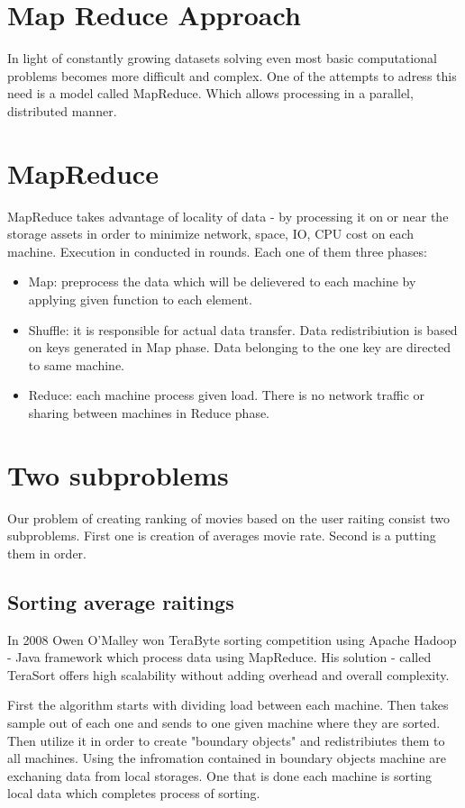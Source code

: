 \section{Map Reduce Approach}
In light of constantly growing datasets solving even 
most basic computational problems becomes more difficult and complex.
One of the attempts to adress this need is a model called MapReduce.
Which allows processing in a parallel, distributed manner.

\section{MapReduce}
MapReduce takes advantage of locality of data - by processing it on 
or near the storage assets in order to minimize network, space, IO, CPU cost on each machine.
Execution in conducted in rounds.  Each one of them three phases:

\begin{itemize}
\item Map: preprocess the data which will be delievered to each machine by applying 
given function to each element. 
\item Shuffle: it is responsible for actual data transfer. Data redistribiution is based on 
keys generated in Map phase. Data belonging to the one key are directed to same machine. 
\item Reduce: each machine process given load. There is no network traffic or sharing between machines
in Reduce phase.
\end{itemize}

\section{Two subproblems}
Our problem of creating ranking of movies based on the user raiting 
consist two subproblems. First one is creation of averages movie rate.
Second is a putting them in order. 

\subsection{Sorting average raitings}
In 2008 Owen O'Malley won TeraByte sorting competition using Apache Hadoop
- Java framework which process data using MapReduce. His solution - called TeraSort offers
high scalability without adding overhead and overall complexity.

First the algorithm starts with dividing load between each machine. Then takes sample 
out of each one and sends to one given machine where they are sorted.
Then utilize it in order to create "boundary objects" and redistribiutes them
to all machines. Using the infromation contained in boundary objects 
machine are exchaning data from local storages.
One that is done each machine is sorting local data which completes process of sorting.

